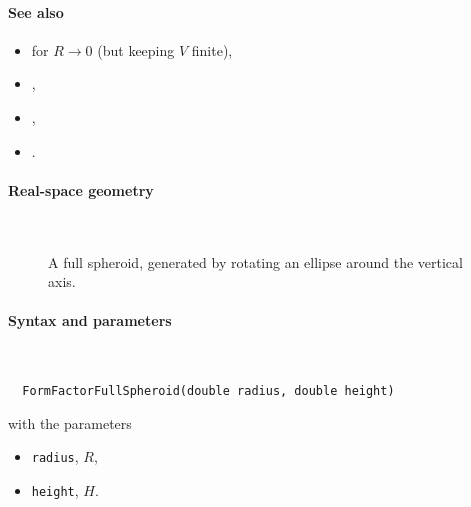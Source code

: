 \paragraph{See also}
\begin{itemize}
\item {} for $R\to0$ (but keeping $V$ finite),
\item {},
\item {},
\item {}.
\end{itemize}

 \label{SFullSpheroid}

\paragraph{Real-space geometry}\strut\\

\begin{figure}[H]
\hfill
{}
\hfill
{}
\hfill
{}
\hfill
\caption{A full spheroid, generated by rotating an ellipse around the vertical axis.}
\end{figure}

\FloatBarrier

\paragraph{Syntax and parameters}\strut\\[-2ex plus .2ex minus .2ex]
\begin{lstlisting}
  FormFactorFullSpheroid(double radius, double height)
\end{lstlisting}
with the parameters
\begin{itemize}
\item \texttt{radius}, $R$,
\item \texttt{height}, $H$.
\end{itemize}


